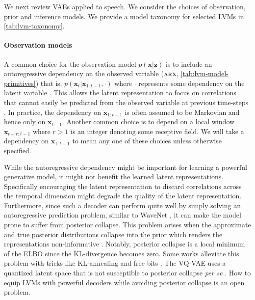 {We next review VAEs applied to speech. We consider the choices of observation, prior and inference models.
We provide a model taxonomy for selected LVMs in \cref{tab:lvm-taxonomy}.


\paragraph{Observation models} 
A common choice for the observation model $p(\mathbf{x}|\mathbf{z})$ is to include an autoregressive dependency on the observed variable (\textbf{\textsc{arx}}, \cref{tab:lvm-model-primitives}) that is, $p(\mathbf{x}_t|\mathbf{x}_{1:t-1}, \cdot)$ where $\cdot$ represents some dependency on the latent variable \parencite{chung_recurrent_2015, fraccaro_sequential_2016, oord_neural_2018, oord_representation_2018}. This allows the latent representation to focus on correlations that cannot easily be predicted from the observed variable at previous time-steps \parencite{oord_representation_2018}. In practice, the dependency on $\mathbf{x}_{1:t-1}$ is often assumed to be Markovian and hence only on $\mathbf{x}_{t-1}$. Another common choice is to depend on a local window $\mathbf{x}_{t-r:t-1}$ where $r>1$ is an integer denoting some receptive field. We will take a dependency on $\mathbf{x}_{1:t-1}$ to mean any one of these choices unless otherwise specified.

While the autoregressive dependency might be important for learning a powerful generative model, it might not benefit the learned latent representations. Specifically encouraging the latent representation to discard correlations across the temporal dimension might degrade the quality of the latent representation.
Furthermore, since such a decoder can perform quite well by simply solving an autoregressive prediction problem, similar to WaveNet \parencite{oord_wavenet_2016}, it can make the model prone to suffer from posterior collapse. This problem arises when the approximate and true posterior distributions collapse into the prior which renders the representations non-informative \parencite{bowman_generating_2016, sonderby_ladder_2016}. Notably, posterior collapse is a local minimum of the ELBO since the KL-divergence becomes zero. 
Some works alleviate this problem with tricks like KL-annealing and free bits \parencite{bowman_generating_2016, sonderby_ladder_2016, kingma_improved_2016}. 
The VQ-VAE uses a quantized latent space that is not susceptible to posterior collapse \textit{per se} \parencite{oord_neural_2018}. How to equip LVMs with powerful decoders while avoiding posterior collapse is an open problem.

}

